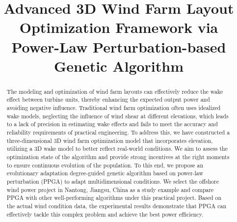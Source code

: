 \documentclass[journal,twoside]{IEEEtran}
\begin{document}
\title{Advanced 3D Wind Farm Layout Optimization Framework via Power-Law Perturbation-based Genetic Algorithm}

\maketitle


\begin{abstract}
The modeling and optimization of wind farm layouts can effectively reduce the wake effect between turbine units, thereby enhancing the expected output power and avoiding negative influence. Traditional wind farm optimization often uses idealized wake models, neglecting the influence of wind shear at different elevations, which leads to a lack of precision in estimating wake effects and fails to meet the accuracy and reliability requirements of practical engineering. To address this, we have constructed a three-dimensional 3D wind farm optimization model that incorporates elevation, utilizing a 3D wake model to better reflect real-world conditions. We aim to assess the optimization state of the algorithm and provide strong incentives at the right moments to ensure continuous evolution of the population. To this end, we propose an evolutionary adaptation degree-guided genetic algorithm based on power-law perturbation (PPGA) to adapt multidimensional conditions. We select the offshore wind power project in Nantong, Jiangsu, China as a study example and compare PPGA with other well-performing algorithms under this practical project. Based on the actual wind condition data, the experimental results demonstrate that PPGA can effectively tackle this complex problem and achieve the best power efficiency.
\end{abstract}
\end{document}
